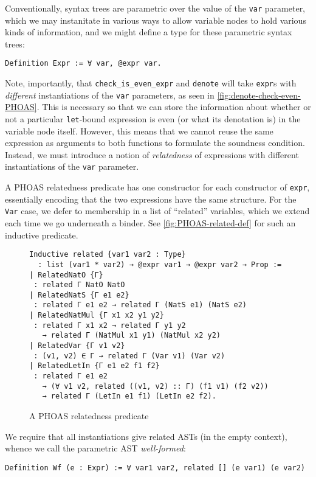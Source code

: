 Conventionally, syntax trees are parametric over the value of the \texttt{var} parameter, which we may instanitate in various ways to allow variable nodes to hold various kinds of information, and we might define a type for these parametric syntax trees:
\begin{verbatim}
Definition Expr := ∀ var, @expr var.
\end{verbatim}
Note, importantly, that \texttt{check_is_even_expr} and \texttt{denote} will take \texttt{expr}s with \emph{different} instantiations of the \texttt{var} parameters, as seen in \autoref{fig:denote-check-even-PHOAS}.
This is necessary so that we can store the information about whether or not a particular \texttt{let}-bound expression is even (or what its denotation is) in the variable node itself.
However, this means that we cannot reuse the same expression as arguments to both functions to formulate the soundness condition.
Instead, we must introduce a notion of \emph{relatedness} of expressions with different instantiations of the \texttt{var} parameter.

A PHOAS relatedness predicate has one constructor for each constructor of \texttt{expr}, essentially encoding that the two expressions have the same structure.
For the \texttt{Var} case, we defer to membership in a list of ``related'' variables, which we extend each time we go underneath a binder.
See \autoref{fig:PHOAS-related-def} for such an inductive predicate.

\begin{figure}
\centering
\begin{verbatim}
Inductive related {var1 var2 : Type}
  : list (var1 * var2) → @expr var1 → @expr var2 → Prop :=
| RelatedNatO {Γ}
 : related Γ NatO NatO
| RelatedNatS {Γ e1 e2}
 : related Γ e1 e2 → related Γ (NatS e1) (NatS e2)
| RelatedNatMul {Γ x1 x2 y1 y2}
 : related Γ x1 x2 → related Γ y1 y2
   → related Γ (NatMul x1 y1) (NatMul x2 y2)
| RelatedVar {Γ v1 v2}
 : (v1, v2) ∈ Γ → related Γ (Var v1) (Var v2)
| RelatedLetIn {Γ e1 e2 f1 f2}
 : related Γ e1 e2
   → (∀ v1 v2, related ((v1, v2) :: Γ) (f1 v1) (f2 v2))
   → related Γ (LetIn e1 f1) (LetIn e2 f2).
\end{verbatim}
\caption{A PHOAS relatedness predicate}\label{fig:PHOAS-related-def}
\end{figure}

We require that all instantiations give related ASTs (in the empty context), whence we call the parametric AST \emph{well-formed}:
\begin{verbatim}
Definition Wf (e : Expr) := ∀ var1 var2, related [] (e var1) (e var2)
\end{verbatim}
\label{sec:PHOAS:Wf-def}

